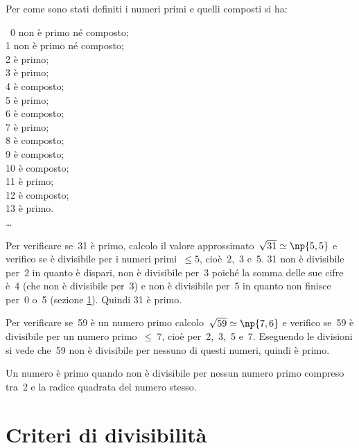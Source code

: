 Per come sono stati definiti i numeri primi e quelli composti si ha:

\begin{multicols}{3}
\noindent~0 non è primo né composto;\\
1 non è primo né composto;\\
2 è primo;\\
3 è primo;\\
4 è composto;\\
5 è primo;\\
6 è composto;\\
7 è primo;\\
8 è composto;\\
9 è composto;\\
10 è composto;\\
11 è primo;\\
12 è composto;\\
13 è primo.\\
\ldots
\end{multicols}

\begin{exrig}
 \begin{esempio}
 Per verificare se~31 è primo, calcolo il valore approssimato~$\sqrt{31}\simeq\np{5,5}$ e verifico se è divisibile
per i numeri primi~$\le5$, cioè~2,~3 e~5. 31 non è divisibile per~2 in
quanto è dispari, non è divisibile per~3 poiché la somma delle sue cifre è~4 (che non è divisibile per~3) e
non è divisibile per~5 in quanto non finisce per~0 o~5 (sezione \ref{sect:criteri_divisibilita}). Quindi 31 è primo.
 \end{esempio}

 \begin{esempio}
 Per verificare se~59 è un numero primo calcolo~$\sqrt{59}\simeq\np{7,6}$ e verifico se~59 è divisibile per un
numero primo~$\le~7$, cioè per~2,~3,~5 e~7. Eseguendo le divisioni si vede che~59 non è divisibile
per nessuno di questi numeri, quindi è primo.
 \end{esempio}
\end{exrig}

\osservazione Un numero è primo quando non è divisibile per nessun numero primo compreso tra~2 e
la radice quadrata del numero stesso.

\vspazio\ovalbox{\risolvii \ref{ese:1.15}, \ref{ese:1.16}}


\section{Criteri di divisibilità}\label{sect:criteri_divisibilita}

